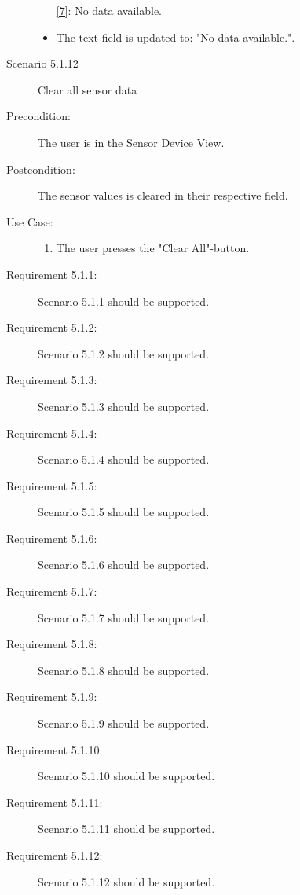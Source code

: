 \documentclass[a4paper]{article}
\begin{document}
\begin{description}
\begin{itemize}
\item [\ref{7}:] No data available.
\item The text field is updated to: "No data available.".
\end{itemize}

\item[]

\item[Scenario 5.1.12] Clear all sensor data
\item[Precondition:] The user is in the Sensor Device View.
\item[Postcondition:] The sensor values is cleared in their respective field.
\item[Use Case:]\mbox{}
\begin{enumerate}
\item \label{7} The user presses the "Clear All"-button.
\end{enumerate}

\item[Requirement 5.1.1:] Scenario 5.1.1 should be supported.
\item[Requirement 5.1.2:] Scenario 5.1.2 should be supported.
\item[Requirement 5.1.3:] Scenario 5.1.3 should be supported.
\item[Requirement 5.1.4:] Scenario 5.1.4 should be supported.
\item[Requirement 5.1.5:] Scenario 5.1.5 should be supported.
\item[Requirement 5.1.6:] Scenario 5.1.6 should be supported.
\item[Requirement 5.1.7:] Scenario 5.1.7 should be supported.
\item[Requirement 5.1.8:] Scenario 5.1.8 should be supported.
\item[Requirement 5.1.9:] Scenario 5.1.9 should be supported.
\item[Requirement 5.1.10:] Scenario 5.1.10 should be supported.
\item[Requirement 5.1.11:] Scenario 5.1.11 should be supported.
\item[Requirement 5.1.12:] Scenario 5.1.12 should be supported.

\end{description}
\end{document}
